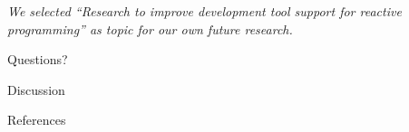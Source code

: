 \documentclass{beamer}
\begin{document}
\begin{frame}
	\begin{center}
		\emph{We selected ``Research to improve development tool support for reactive programming'' as topic for our own future research.}
	\end{center}
\end{frame}

\begin{frame}[focus]
	Questions?
\end{frame}

\begin{frame}[focus]
	Discussion
\end{frame}

\appendix
\begin{frame}[allowframebreaks]{References}
	
	
\end{frame}
\end{document}
